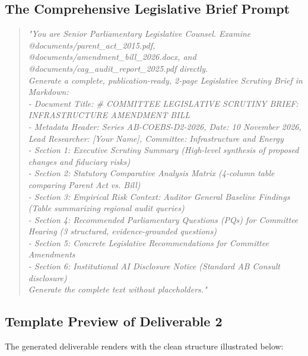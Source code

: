 \documentclass[11pt, a4paper]{report}
\begin{document}
\subsection{The Comprehensive Legislative Brief Prompt}
\begin{quote}
\small
\textit{"You are Senior Parliamentary Legislative Counsel. Examine @documents/parent\_act\_2015.pdf, @documents/amendment\_bill\_2026.docx, and @documents/cag\_audit\_report\_2025.pdf directly. \\
Generate a complete, publication-ready, 2-page Legislative Scrutiny Brief in Markdown: \\
- Document Title: \# COMMITTEE LEGISLATIVE SCRUTINY BRIEF: INFRASTRUCTURE AMENDMENT BILL \\
- Metadata Header: Series AB-COEBS-D2-2026, Date: 10 November 2026, Lead Researcher: [Your Name], Committee: Infrastructure and Energy \\
- Section 1: Executive Scrutiny Summary (High-level synthesis of proposed changes and fiduciary risks) \\
- Section 2: Statutory Comparative Analysis Matrix (4-column table comparing Parent Act vs. Bill) \\
- Section 3: Empirical Risk Context: Auditor General Baseline Findings (Table summarizing regional audit queries) \\
- Section 4: Recommended Parliamentary Questions (PQs) for Committee Hearing (3 structured, evidence-grounded questions) \\
- Section 5: Concrete Legislative Recommendations for Committee Amendments \\
- Section 6: Institutional AI Disclosure Notice (Standard AB Consult disclosure) \\
Generate the complete text without placeholders."}
\end{quote}

\subsection{Template Preview of Deliverable 2}
The generated deliverable renders with the clean structure illustrated below:
\end{document}
